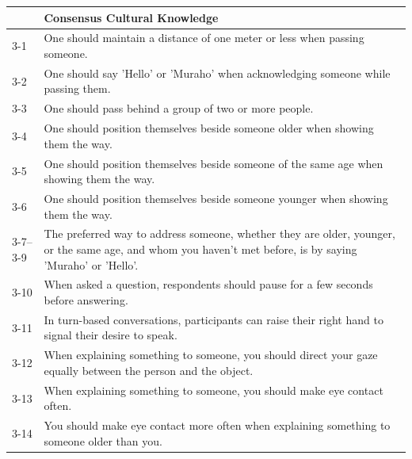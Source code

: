 \documentclass{CSSRforAfrica}
\begin{document}
\begin{table}[H]
\begin{center}
\vspace{-10mm}
\begin{tabularx}{\linewidth}{|l|X|}
\hline \hline
 {\small {\bf }}  & {\small {\bf Consensus Cultural Knowledge}}\\
\hline
{\small 3-1 }  & {\small One should maintain a distance of one meter or less when passing someone.}\\

{\small 3-2 }  & {\small One should say 'Hello' or 'Muraho' when acknowledging someone while passing them.}\\

{\small 3-3 }  & {\small One should pass behind a group of two or more people.}\\

{\small 3-4 }  & {\small One should position themselves beside someone older when showing them the way.}\\

{\small 3-5 }  & {\small One should position themselves beside someone of the same age when showing them the way.}\\

{\small 3-6 }  & {\small One should position themselves beside someone younger when showing them the way.}\\

{\small 3-7--3-9 } & {\small The preferred way to address someone, whether they are older, younger, or the same age, and whom you haven't met before, is by saying 'Muraho' or 'Hello'.}\\

{\small 3-10 }  & {\small When asked a question, respondents should pause for a few seconds before answering.}\\

{\small 3-11 }  & {\small In turn-based conversations, participants can raise their right hand to signal their desire to speak.}\\

{\small 3-12 }  & {\small When explaining something to someone, you should direct your gaze equally between the person and the object.}\\

{\small 3-13 }  & {\small When explaining something to someone, you should make eye contact often.}\\

{\small 3-14 }  & {\small You should make eye contact more often when explaining something to someone older than you.}\\


\end{tabularx}
\end{center}
\end{table}
\end{document}
